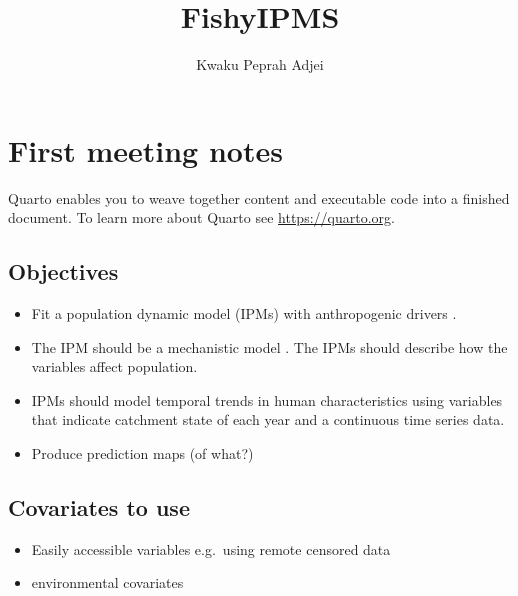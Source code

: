 \documentclass[
]{article}
\title{FishyIPMS}
\author{Kwaku Peprah Adjei}
\date{}
\begin{document}
\maketitle
\ifdefined\Shaded\renewenvironment{Shaded}{\begin{tcolorbox}[enhanced, borderline west={3pt}{0pt}{shadecolor}, frame hidden, boxrule=0pt, interior hidden, sharp corners, breakable]}{\end{tcolorbox}}\fi

\hypertarget{first-meeting-notes}{%
\section{First meeting notes}\label{first-meeting-notes}}

Quarto enables you to weave together content and executable code into a
finished document. To learn more about Quarto see
\url{https://quarto.org}.

\hypertarget{objectives}{%
\subsection{Objectives}\label{objectives}}

\begin{itemize}
\item
  Fit a population dynamic model (IPMs) with anthropogenic drivers
  \citep[human driven factors such as climate change, direct exploitation, pollution, biological invasions, sea-use change; ][]{moullec2021identifying}.
\item
  The IPM should be a mechanistic model
  \citep[plug and play;][]{frost2023integrated, smallegange2017mechanistic}.
  The IPMs should describe how the variables affect population.
\item
  IPMs should model temporal trends in human characteristics using
  variables that indicate catchment state of each year and a continuous
  time series data.
\item
  Produce prediction maps (of what?)
\end{itemize}

\hypertarget{covariates-to-use}{%
\subsection{Covariates to use}\label{covariates-to-use}}

\begin{itemize}
\item
  Easily accessible variables e.g.~using remote censored data
\item
  environmental covariates
\end{itemize}
\end{document}
